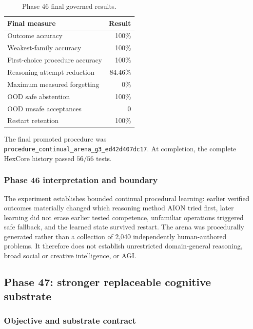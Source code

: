 \begin{table}[htbp]
\centering
\begin{tabular}{lr}
\hline
\textbf{Final measure} & \textbf{Result}\\
\hline
Outcome accuracy & 100\%\\
Weakest-family accuracy & 100\%\\
First-choice procedure accuracy & 100\%\\
Reasoning-attempt reduction & 84.46\%\\
Maximum measured forgetting & 0\%\\
OOD safe abstention & 100\%\\
OOD unsafe acceptances & 0\\
Restart retention & 100\%\\
\hline
\end{tabular}
\caption{Phase 46 final governed results.}
\label{tab:phase46-final-results}
\end{table}

The final promoted procedure was
\texttt{procedure\_continual\_arena\_g3\_ed42d407dc17}.  At completion,
the complete HexCore history passed \(56/56\) tests.

\subsubsection{Phase 46 interpretation and boundary}

The experiment establishes bounded continual procedural learning: earlier
verified outcomes materially changed which reasoning method AION tried first,
later learning did not erase earlier tested competence, unfamiliar operations
triggered safe fallback, and the learned state survived restart.  The arena
was procedurally generated rather than a collection of 2,040 independently
human-authored problems.  It therefore does not establish unrestricted
domain-general reasoning, broad social or creative intelligence, or AGI.

\subsection{Phase 47: stronger replaceable cognitive substrate}
\label{subsec:phase47-gemma-substrate}

\subsubsection{Objective and substrate contract}

